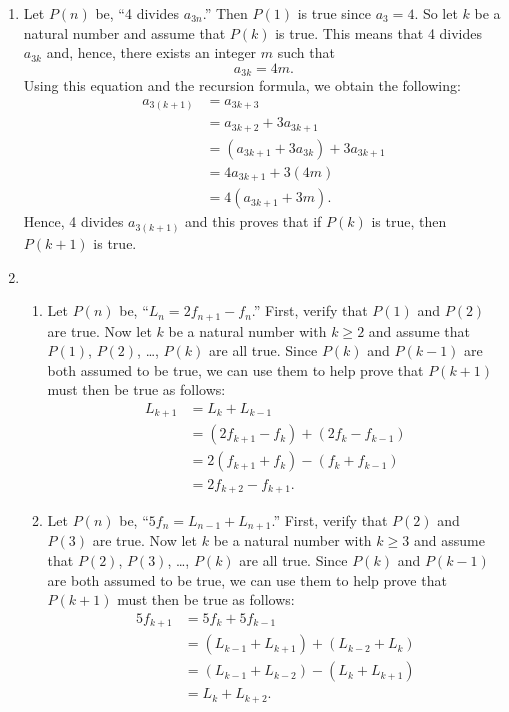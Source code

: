 \begin{enumerate}
\item Let $P(n)$ be, ``4 divides $a_{3n}$.''  Then $P(1)$ is true since $a_3 = 4$.  So let $k$ be a natural number and assume that $P(k)$ is true.  This means that 4 divides $a_{3k}$ and, hence, there exists an integer $m$ such that
\[
a_{3k} = 4m.
\]
Using this equation and the recursion formula, we obtain the following:
\begin{align*}
a_{3(k + 1)} &= a_{3k + 3} \\
             &= a_{3k + 2} + 3a_{3k + 1} \\
             &= \left( a_{3k + 1} + 3a_{3k} \right) + 3a_{3k + 1} \\
             &= 4a_{3k + 1} + 3(4m) \\
             &= 4 \left( a_{3k + 1} + 3m \right).
\end{align*}
Hence, 4 divides $a_{3(k + 1)}$ and this proves that if $P(k)$ is true, then 
$P(k + 1)$ is true.




\item \begin{enumerate}
\item Let $P(n)$ be, ``$L_n = 2f_{n+1} - f_n$.''  First, verify that $P(1)$ and $P(2)$ are true.  Now let $k$ be a natural number with $k \geq 2$ and assume that $P(1)$, $P(2)$, \ldots, 
$P(k)$ are all true. Since $P(k)$ and $P(k-1)$ are both assumed to be true, we can use them to help prove that $P(k+1)$ must then be true as follows:
\begin{align*}
L_{k+1} &= L_k + L_{k-1} \\
        &= \left( 2f_{k+1} - f_k \right) + \left( 2f_k - f_{k-1} \right) \\
        &= 2 \left( f_{k+1} + f_k \right) - \left( f_k + f_{k-1} \right) \\
        &= 2f_{k+2} - f_{k+1}.
\end{align*}



\item Let $P(n)$ be, ``$5f_n = L_{n-1} + L_{n+1}$.''  First, verify that $P(2)$ and $P(3)$ are true.  Now let $k$ be a natural number with $k \geq 3$ and assume that $P(2)$, $P(3)$, \ldots, 
$P(k)$ are all true. Since $P(k)$ and $P(k-1)$ are both assumed to be true, we can use them to help prove that $P(k+1)$ must then be true as follows:
\begin{align*}
5f_{k+1} &= 5f_k + 5f_{k-1} \\
        &= \left( L_{k-1} + L_{k+1} \right) + \left( L_{k-2} + L_k \right) \\
        &= \left( L_{k-1} + L_{k-2} \right) - \left( L_k + L_{k+1} \right) \\
        &= L_k + L_{k+2}.
\end{align*}



\end{enumerate}
\end{enumerate}
